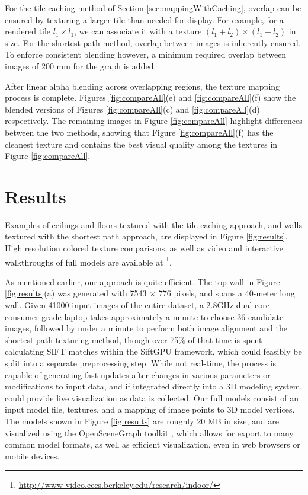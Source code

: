 \documentclass{llncs}
\begin{document}
For the tile caching method of Section \ref{sec:mappingWithCaching},
overlap can be ensured by texturing a larger tile than needed for
display. For example, for a rendered tile $l_1 \times l_1$, we can
associate it with a texture $(l_1 + l_2) \times (l_1 + l_2)$ in size.
For the shortest path method, overlap between images is inherently
ensured. To enforce consistent blending however, a minimum required
overlap between images of 200 mm for the graph is added.

After linear alpha blending across overlapping regions, the texture
mapping process is complete. Figures \ref{fig:compareAll}(e) and
\ref{fig:compareAll}(f) show the blended versions of Figures
\ref{fig:compareAll}(c) and \ref{fig:compareAll}(d) respectively. The
remaining images in Figure \ref{fig:compareAll} highlight differences
between the two methods, showing that Figure \ref{fig:compareAll}(f)
has the cleanest texture and contains the best visual quality among
the textures in Figure \ref{fig:compareAll}.

\section{Results}
\label{sec:results}
Examples of ceilings and floors textured with the tile caching
approach, and walls textured with the shortest path approach, are
displayed in Figure \ref{fig:results}. High resolution colored texture
comparisons, as well as video and interactive walkthroughs of full
models are available at
\footnote{\url{http://www-video.eecs.berkeley.edu/research/indoor/}}.

As mentioned earlier, our approach is quite efficient. The top wall in
Figure \ref{fig:results}(a) was generated with 7543 $\times$ 776
pixels, and spans a 40-meter long wall. Given 41000 input images of
the entire dataset, a 2.8GHz dual-core consumer-grade laptop takes
approximately a minute to choose 36 candidate images, followed by
under a minute to perform both image alignment and the shortest path
texturing method, though over 75\% of that time is spent calculating
SIFT matches within the SiftGPU framework, which could feasibly be
split into a separate preprocessing step. While not real-time, the
process is capable of generating fast updates after changes in various
parameters or modifications to input data, and if integrated directly
into a 3D modeling system, could provide live visualization as data is
collected. Our full models consist of an input model file, textures,
and a mapping of image points to 3D model vertices. The models shown
in Figure \ref{fig:results} are roughly 20 MB in size, and are
visualized using the OpenSceneGraph toolkit \cite{openscenegraph},
which allows for export to many common model formats, as well as
efficient visualization, even in web browsers or mobile devices.
\end{document}
